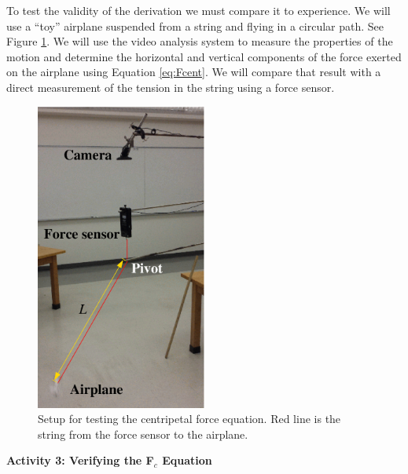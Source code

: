 To test the validity of the derivation we must compare it to experience. We
will use a ``toy'' airplane suspended from a string and flying
in a circular path. See Figure \ref{fig:airplane}. 
We will use the video analysis system to measure the properties
of the motion and determine the horizontal and vertical components of the force
exerted on the airplane using Equation \ref{eq:Fcent}. We will compare that result with a
direct measurement of the tension in the string using a force sensor. 
\begin{figure}[hbt]
\begin{center}
\includegraphics[height=4.0in]{centripetalForceFor132/airplaneSetupB.eps}
\caption{Setup for testing the centripetal force equation. Red line is the
string from the force sensor to the airplane.}\label{fig:airplane}
\end{center}
\end{figure}

\textbf{Activity 3: Verifying the F\( _{c} \) Equation }

